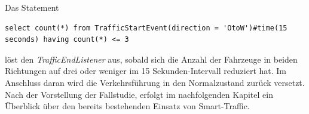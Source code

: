 Das Statement 

\begin{lstlisting}
select count(*) from TrafficStartEvent(direction = 'OtoW')#time(15 seconds) having count(*) <= 3
\end{lstlisting}

löst den \textit{TrafficEndListener} aus, sobald sich die Anzahl der Fahrzeuge in beiden Richtungen auf drei oder weniger im 15 Sekunden-Intervall reduziert hat. Im Anschluss daran wird die Verkehrsführung in den Normalzustand zurück versetzt.\\
Nach der Vorstellung der Fallstudie, erfolgt im nachfolgenden Kapitel ein Überblick über den bereits bestehenden Einsatz von Smart-Traffic.



\clearpage

